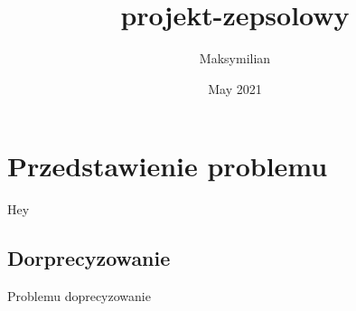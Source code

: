 \documentclass{article}
\title{projekt-zepsolowy}
\author{Maksymilian }
\date{May 2021}
\begin{document}
\maketitle
\tableofcontents
\newpage

\section{Przedstawienie problemu}
Hey

\subsection{Dorprecyzowanie}
Problemu doprecyzowanie
\end{document}
